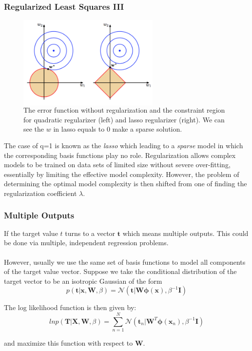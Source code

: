 \documentclass{beamer}
\begin{document}
\begin{frame}
\frametitle{Regularized Least Squares III}


\begin{figure}
\begin{columns}
\includegraphics[width=7cm]{Figure4}
\caption{The  error function without regularization and the constraint region for quadratic regularizer (left) and lasso regularizer (right). We can see the $w$ in lasso equals to 0 make a sparse solution.}
\end{columns}
\end{figure}


The case of q=1 is known as the \textit{lasso} which leading to a \textit{sparse} model in which the corresponding basis functions play no role.
Regularization allows complex models to be trained on data sets of limited size without severe over-fitting, essentially by limiting the effective model complexity. However, the problem of determining the optimal model complexity is then shifted from one of finding the regularization coefficient $\lambda$.
\end{frame}


\begin{frame}
\frametitle{Multiple Outputs}
If the target value $t$ turns to a vector $\bm{t}$ which means multiple outputs. This could be done via multiple, independent regression problems.\\~\\

However, usually we use the same set of basis functions to model all components of the target value vector. Suppose we take the conditional distribution of the target vector to be an isotropic Gaussian of the form
\begin{equation}
p(\bm{t}|\bm{x},\bm{W},\beta)=\mathcal{N}(\bm{t}|\bm{W}\bm{\phi}(\bm{x}),\beta^{-1}\bm{I})
\end{equation}

The log likelihood function is then given by:
\begin{equation}
ln p(\bm{T}|\bm{X},\bm{W},\beta) = \sum_{n=1}^{N}\mathcal{N}(\bm{t}_n|\bm{W}^T \bm{\phi}(\bm{x}_n),\beta^{-1}\bm{I})
\end{equation}

and maximize this function with respect to $\bm{W}$.

\end{frame}
\end{document}
